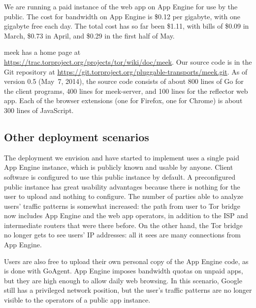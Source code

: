 \documentclass[conference]{IEEEtran}
\def\meekserver{\mbox{meek-server}}
\begin{document}
We are running a paid instance of the web app on App Engine for use by the public.
The cost for bandwidth on App Engine is \$0.12 per gigabyte,
with one gigabyte free each day.
The total cost has so far been \$1.11, with bills of
\$0.09 in March,
\$0.73 in April,
and \$0.29 in the first half of May.

meek has a home page at
\url{https://trac.torproject.org/projects/tor/wiki/doc/meek}.
Our source code is in the Git repository at
\url{https://git.torproject.org/pluggable-transports/meek.git}.
As of version 0.5 (May~7, 2014), the source code consists of
about 800 lines of Go for the client programs,
400 lines for \meekserver, and
100 lines for the reflector web app.
Each of the browser extensions
(one for Firefox, one for Chrome)
is about 300 lines of JavaScript.


\subsection{Other deployment scenarios}
\label{sec:otherdeployment}

The deployment we envision and have started to implement
uses a single paid App Engine instance, which is publicly known and usable by anyone.
Client software is configured to use this public instance by default.
A preconfigured public instance has great usability advantages
because there is nothing for the user to upload and nothing to configure.
The number of parties able to analyze users' traffic patterns is somewhat increased:
the path from user to Tor bridge now includes App Engine and the web app operators,
in addition to the ISP and intermediate routers that were there before.
On the other hand, the Tor bridge no longer gets to see users' IP addresses:
all it sees are many connections from App Engine.

Users are also free to upload their own personal copy of the App Engine code, as is done with GoAgent.
App Engine imposes bandwidth quotas on unpaid apps, but they are high enough to allow daily web browsing.
In this scenario, Google still has a privileged network position,
but the user's traffic patterns are no longer visible to the operators of a public app instance.
\end{document}

